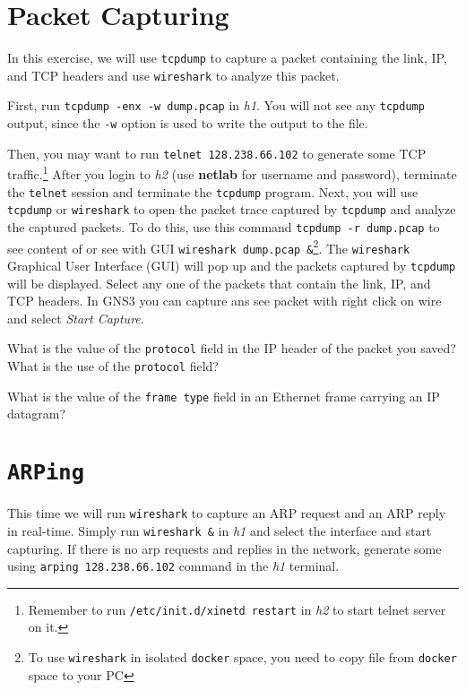 \documentclass{../UTNetLab}
\begin{document}
\section{Packet Capturing}
    In this exercise, we will use \lstinline{tcpdump} to capture a packet containing the link, IP, and TCP headers and use \lstinline{wireshark} to analyze this packet.

    First, run \lstinline{tcpdump -enx -w dump.pcap} in \textit{h1}.
    You will not see any \lstinline{tcpdump} output, since the \lstinline{-w} option is used to write the output to the  file.

    Then, you may want to run \lstinline{telnet 128.238.66.102} to generate some TCP traffic.\footnote{Remember to run \lstinline{/etc/init.d/xinetd restart} in \textit{h2} to start telnet server on it.}
    After you login to \textit{h2} (use \textbf{netlab} for username and password), terminate the \lstinline{telnet} session and terminate the \lstinline{tcpdump} program.
    Next, you will use \lstinline{tcpdump} or \lstinline{wireshark} to open the packet trace captured by \lstinline{tcpdump} and analyze the captured packets.
    To do this, use this command \lstinline{tcpdump -r dump.pcap} to see content of  or see with GUI \lstinline{wireshark dump.pcap &}\footnote{To use \lstinline{wireshark} in isolated \lstinline{docker} space, you need to copy file from  \lstinline{docker} space to your PC}.
    The \lstinline{wireshark} Graphical User Interface (GUI) will pop up and the packets captured by \lstinline{tcpdump} will be displayed.
    Select any one of the packets that contain the link, IP, and TCP headers.
    In GNS3 you can capture ans see packet with right click on wire and select \textit{Start Capture}.
    
    \begin{report}
        \item What is the value of the \texttt{protocol} field in the IP header of the packet you saved?
            What is the use of the \texttt{protocol} field?

        \item What is the value of the \texttt{frame type} field in an Ethernet frame carrying an IP datagram?
    \end{report}

\section{\texttt{ARPing}}
    This time we will run \lstinline{wireshark} to capture an ARP request and an ARP reply in real-time.
    Simply run \lstinline{wireshark &} in \textit{h1} and select the interface and start capturing.
    If there is no arp requests and replies in the network, generate some using \lstinline{arping 128.238.66.102} command in the \textit{h1} terminal.
\end{document}
